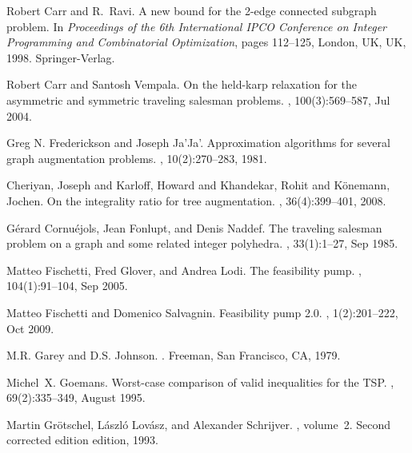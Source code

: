 \documentclass[runningheads]{llncs}
\begin{document}
%
%
%
% 
% 
%
\begin{thebibliography}{10}
	
	Robert Carr and R.~Ravi.
	\newblock A new bound for the 2-edge connected subgraph problem.
	\newblock In {\em Proceedings of the 6th International IPCO Conference on
		Integer Programming and Combinatorial Optimization}, pages 112--125, London,
	UK, UK, 1998. Springer-Verlag.
	
	Robert Carr and Santosh Vempala.
	\newblock On the held-karp relaxation for the asymmetric and symmetric
	traveling salesman problems.
	, 100(3):569--587, Jul 2004.
	
	Greg N. Frederickson and Joseph Ja'Ja'.
	\newblock Approximation algorithms for several graph
	augmentation problems.
	, 10(2):270--283, 1981.
	
	Cheriyan, Joseph and Karloff, Howard and Khandekar, Rohit and K{\"o}nemann, Jochen.
	\newblock On the integrality ratio for tree augmentation.
	, 36(4):399--401, 2008.
	
	G{\'e}rard Cornu{\'e}jols, Jean Fonlupt, and Denis Naddef.
	\newblock The traveling salesman problem on a graph and some related integer
	polyhedra.
	, 33(1):1--27, Sep 1985.
	
	Matteo Fischetti, Fred Glover, and Andrea Lodi.
	\newblock The feasibility pump.
	, 104(1):91--104, Sep 2005.
	
	Matteo Fischetti and Domenico Salvagnin.
	\newblock Feasibility pump 2.0.
	, 1(2):201--222, Oct 2009.
	
	M.R. Garey and D.S. Johnson.
	.
	\newblock Freeman, San Francisco, CA, 1979.
	
	Michel~X. Goemans.
	\newblock Worst-case comparison of valid inequalities for the {TSP}.
	, 69(2):335--349, August 1995.
	
	Martin Gr{\"o}tschel, L{\'a}szl{\'o} Lov{\'a}sz, and Alexander Schrijver.
	, volume~2.
	\newblock Second corrected edition edition, 1993.
	

\end{thebibliography}
\end{document}
